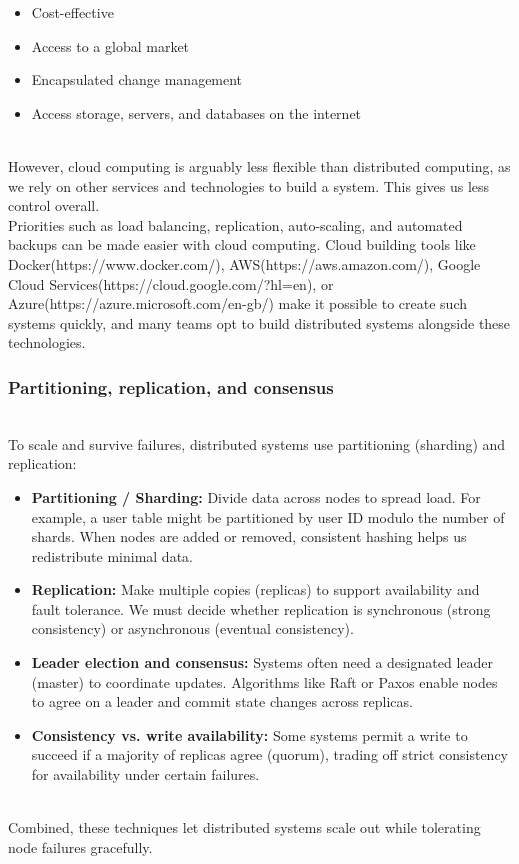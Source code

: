 \begin{itemize}
\item
\protect{}\label{-4RyFZSVxAik5r-DEakWZ}
Cost-effective
\item
\protect{}\label{AAO9MlwLJf5EoNX6Abmq3}
Access to a global market
\item
\protect{}\label{Bgv7sEZLCVCV20BCnvcFD}
Encapsulated change management
\item
\protect{}\label{D7JdEQczAEA3dYiaHIz-M}
Access storage, servers, and databases on the internet
\end{itemize}
\\
However, cloud computing is arguably less flexible than distributed computing, as we rely on other services and technologies to build a system. This gives us less control overall.
\\
Priorities such as load balancing, replication, auto-scaling, and automated backups can be made easier with cloud computing. Cloud building tools like Docker(https://www.docker.com/), AWS(https://aws.amazon.com/), Google Cloud Services(https://cloud.google.com/?hl=en), or Azure(https://azure.microsoft.com/en-gb/) make it possible to create such systems quickly, and many teams opt to build distributed systems alongside these technologies.

\subsubsection{Partitioning, replication, and consensus}\label{fYkLx3dycXjCptRHeobW-}
\\
To scale and survive failures, distributed systems use partitioning (sharding) and replication:

\begin{itemize}
\item
\protect{}\label{1EbAHtQm44aTGECgR__Kn}
\textbf{Partitioning / Sharding:} Divide data across nodes to spread load. For example, a user table might be partitioned by user ID modulo the number of shards. When nodes are added or removed, consistent hashing helps us redistribute minimal data.
\item
\protect{}\label{BbtCFHx5MQ5V76wIeRA4m}
\textbf{Replication:} Make multiple copies (replicas) to support availability and fault tolerance. We must decide whether replication is synchronous (strong consistency) or asynchronous (eventual consistency).
\item
\protect{}\label{I5yv8fric8P5yN08MmP2S}
\textbf{Leader election and consensus:} Systems often need a designated leader (master) to coordinate updates. Algorithms like Raft or Paxos enable nodes to agree on a leader and commit state changes across replicas.
\item
\protect{}\label{tCFjsRDMsLFsEKP1DoKSp}
\textbf{Consistency vs. write availability:} Some systems permit a write to succeed if a majority of replicas agree (quorum), trading off strict consistency for availability under certain failures.
\end{itemize}
\\
Combined, these techniques let distributed systems scale out while tolerating node failures gracefully.

